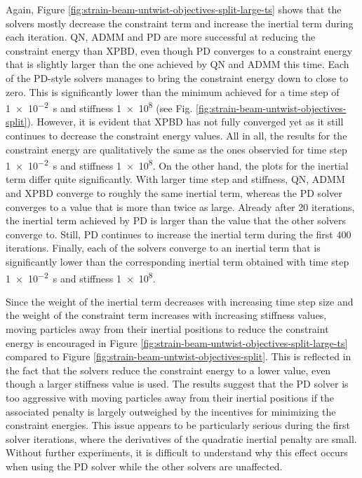 Again, Figure \ref{fig:strain-beam-untwist-objectives-split-large-ts} shows that the solvers mostly decrease the constraint term and increase the inertial term during each 
iteration. QN, ADMM and PD are more successful at reducing the constraint energy than XPBD, even 
though PD converges to a constraint energy that is slightly larger than the one achieved by QN and ADMM this time. Each of the PD-style solvers manages to bring the 
constraint energy down to close to zero. This is significantly lower than the minimum achieved for a time step of \SI{1e-2}{\second} and stiffness \num{1e8} (see 
Fig. \ref{fig:strain-beam-untwist-objectives-split}). However, it is evident that XPBD has not fully converged yet as it still continues to decrease the constraint energy 
values. All in all, the results for the constraint energy are qualitatively the same as the ones observied for 
time step \SI{1e-2}{\second} and stiffness \num{1e8}. On the other hand, the plots for the inertial term differ quite significantly. With larger time step and stiffness,
QN, ADMM and XPBD converge to roughly the same inertial term, whereas the PD solver converges to a value that is more than twice as large. Already after 20 iterations, 
the inertial term achieved by PD is larger than the value that the other solvers converge to. Still, PD continues to increase the inertial term during the first 400 
iterations. Finally, each of the solvers converge to an inertial term that is significantly lower than the corresponding inertial term obtained with time step 
\SI{1e-2}{\second} and stiffness \num{1e8}.

Since the weight of the inertial term decreases with increasing time step size and the weight of the constraint term increases with increasing stiffness values, moving 
particles away from their inertial positions to reduce the constraint energy is encouraged in Figure \ref{fig:strain-beam-untwist-objectives-split-large-ts} compared to
Figure \ref{fig:strain-beam-untwist-objectives-split}. This is reflected in the fact that the solvers reduce the constraint energy to a lower value, even though a larger 
stiffness value is used. The results suggest that the PD solver is too aggressive with moving particles away from their inertial positions if the associated penalty 
is largely outweighed by the incentives for minimizing the constraint energies. This issue 
appears to be particularly serious during the first solver iterations, where the derivatives of the quadratic inertial penalty are small. 
Without further experiments, it is difficult to understand why this effect occurs when using the PD solver while the other solvers are unaffected.

